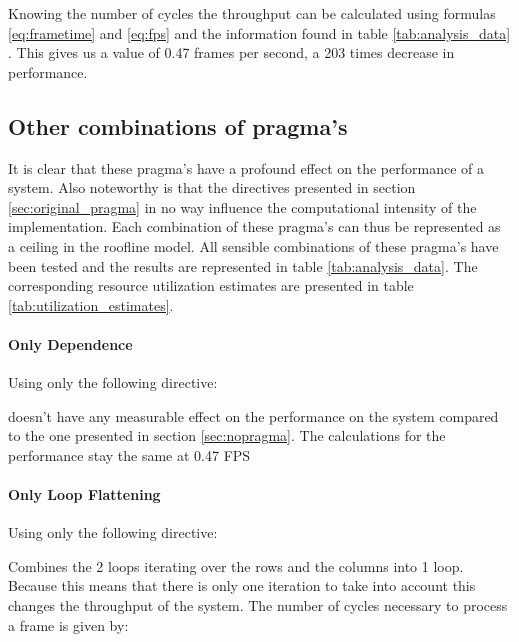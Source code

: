 Knowing the number of cycles the throughput can be calculated using formulas \ref{eq:frametime} and \ref{eq:fps} and the information found in table \ref{tab:analysis_data} . This gives us a value of 0.47 frames per second, a 203 times decrease in performance.

\subsection{Other combinations of pragma's}

It is clear that these pragma's have a profound effect on the performance of a system. Also noteworthy is that the directives presented in section \ref{sec:original_pragma} in no way influence the computational intensity of the implementation. Each combination of these pragma's can thus be represented as a ceiling in the roofline model.
All sensible combinations of these pragma's have been tested and the results are represented in table  \ref{tab:analysis_data}. The corresponding resource utilization estimates are presented in table \ref{tab:utilization_estimates}.

\paragraph{Only Dependence}
Using only the following directive:


doesn't have any measurable effect on the performance on the system compared to the one presented in section \ref{sec:nopragma}. The calculations for the performance stay the same at 0.47 FPS

\paragraph{Only Loop Flattening}
Using only the following directive:


Combines the 2 loops iterating over the rows and the columns into 1 loop. Because this means that there is only one iteration to take into account this changes the throughput of the system. The number of cycles necessary to process a frame is given by:



